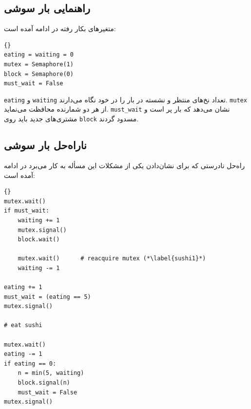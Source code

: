 \documentclass{book}
\newcommand{\clearemptydoublepage}{\newpage\cleardoublepage}
\begin{document}
\subsection{راهنمایی بار سوشی}

    متغیرهای بکار رفته در ادامه آمده است:

\begin{latin}
\begin{lstlisting}[title=\rl{راهنمایی بار سوشی}]{}
eating = waiting = 0
mutex = Semaphore(1)
block = Semaphore(0)
must_wait = False
\end{lstlisting}
\end{latin}



    {\tt eating} و {\tt waiting}
    تعداد نخ‌های منتظر و نشسته در بار را در خود نگاه می‌دارند. {\tt mutex}  از هر دو شمارنده محافظت می‌نماید.  {\tt must\_wait}
    نشان می‌دهد که بار پر است و مشتری‌های جدید باید روی  {\tt block} مسدود گردند. 
    

\clearemptydoublepage
\subsection{ناراه‌حل بار سوشی}

    راه‌حل نادرستی که  برای نشان‌دادن یکی از مشکلات این مسأله به کار می‌برد در ادامه آمده است: 

\begin{latin}
\begin{lstlisting}[title=\rl{ناراه‌حل بار سوشی}]{}
mutex.wait()
if must_wait:
    waiting += 1
    mutex.signal()
    block.wait()

    mutex.wait()      # reacquire mutex (*\label{sushi1}*)
    waiting -= 1

eating += 1
must_wait = (eating == 5)
mutex.signal()

# eat sushi

mutex.wait()
eating -= 1
if eating == 0:
    n = min(5, waiting)
    block.signal(n)
    must_wait = False
mutex.signal()
\end{lstlisting}
\end{latin}
\end{document}
